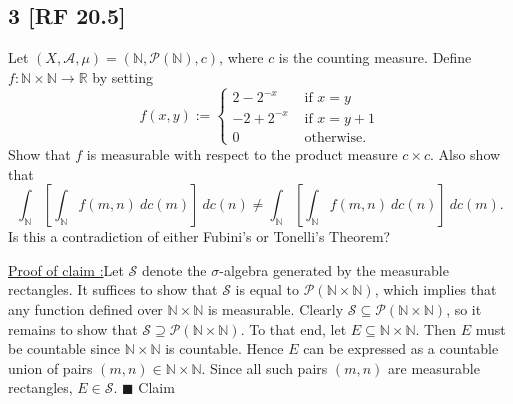 \documentclass[12pt]{article}
\newcounter{ProofCounter}
\newcounter{ClaimCounter}[ProofCounter]
\newenvironment{claim}[1]{\vspace{1mm}\stepcounter{ClaimCounter}\par\noindent\underline{\bf Claim \theClaimCounter:}\space#1}{}
\newenvironment{claimproof}[1]{\par\noindent\underline{Proof of claim \theClaimCounter:}\space#1}{\hfill $\blacksquare$ Claim \theClaimCounter}
\begin{document}
\subsection*{3 [RF 20.5]}
\begin{tcolorbox}
Let $(X,\mathcal{A},\mu) = (\mathbb{N}, \mathcal{P}(\mathbb{N}), c)$, where $c$ is the counting measure. Define $f : \mathbb{N} \times \mathbb{N}
\rightarrow \mathbb{R}$ by setting 
\[ f(x,y) := \left\{ \begin{array}{cl}
2 - 2^{-x} & \text{ if } x = y \\
-2 + 2^{-x} & \text{ if } x = y + 1 \\
0 & \text{ otherwise. }
\end{array} \right.
\]
Show that $f$ is measurable with respect to the product measure $c\times c$. Also show that 
\[ \int_{\mathbb{N}}\left[ \int_{\mathbb{N}}f(m,n)\ dc(m) \right]\ dc(n) \neq \int_{\mathbb{N}}\left[ \int_{\mathbb{N}}f(m,n)\ dc(n) \right]\ dc(m).\]
Is this a contradiction of either Fubini's or Tonelli's Theorem?
\end{tcolorbox}
\begin{claimproof}
Let $\mathcal{S}$ denote the $\sigma$-algebra generated by the measurable rectangles.
It suffices to show that $\mathcal{S}$ is equal to $\mathcal{P}(\mathbb{N}\times \mathbb{N})$, which implies that any function defined over
$\mathbb{N}\times\mathbb{N}$ is measurable. Clearly $\mathcal{S} \subseteq
\mathcal{P}(\mathbb{N}\times\mathbb{N})$, so it remains to show that $\mathcal{S} \supseteq \mathcal{P}(\mathbb{N}\times\mathbb{N})$. To that end, let
$E \subseteq \mathbb{N}\times\mathbb{N}$. Then $E$ must be countable since $\mathbb{N}\times \mathbb{N}$ is countable. Hence $E$ can be expressed as a
countable union of pairs $(m,n) \in \mathbb{N}\times\mathbb{N}$. Since all such pairs $(m,n)$ are measurable rectangles, $E \in \mathcal{S}$.
\end{claimproof}
\end{document}
